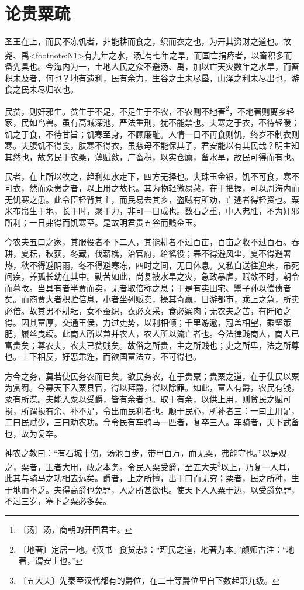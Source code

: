 \documentclass[12pt,UTF-8,openany]{ctexbook}
\begin{document}
\chapter{论贵粟疏}

\begin{normalsize}
    
    圣王在上，而民不冻饥者，非能耕而食之，织而衣之也，为开其资财之道也。故尧、禹<footnote:N1>有九年之水，汤\footnote{〔汤〕汤，商朝的开国君主。}有七年之旱，而国亡捐瘠者，以畜积多而备先具也。今海内为一，土地人民之众不避汤、禹，加以亡天灾数年之水旱，而畜积未及者，何也？地有遗利，民有余力，生谷之土未尽垦，山泽之利未尽出也，游食之民未尽归农也。
    
    民贫，则奸邪生。贫生于不足，不足生于不农，不农则不地著\footnote{〔地著〕定居一地。《汉书·食货志》：“理民之道，地著为本。”颜师古注：“地著，谓安土也。”}，不地著则离乡轻家，民如鸟兽。虽有高城深池，严法重刑，犹不能禁也。夫寒之于衣，不待轻暖；饥之于食，不待甘旨；饥寒至身，不顾廉耻。人情一日不再食则饥，终岁不制衣则寒。夫腹饥不得食，肤寒不得衣，虽慈母不能保其子，君安能以有其民哉？明主知其然也，故务民于农桑，薄赋敛，广畜积，以实仓廪，备水旱，故民可得而有也。
    
    民者，在上所以牧之，趋利如水走下，四方无择也。夫珠玉金银，饥不可食，寒不可衣，然而众贵之者，以上用之故也。其为物轻微易藏，在于把握，可以周海内而无饥寒之患。此令臣轻背其主，而民易去其乡，盗贼有所劝，亡逃者得轻资也。粟米布帛生于地，长于时，聚于力，非可一日成也。数石之重，中人弗胜，不为奸邪所利；一日弗得而饥寒至。是故明君贵五谷而贱金玉。
    
    今农夫五口之家，其服役者不下二人，其能耕者不过百亩，百亩之收不过百石。春耕，夏耘，秋获，冬藏，伐薪樵，治官府，给徭役；春不得避风尘，夏不得避署热，秋不得避阴雨，冬不得避寒冻，四时之间，无日休息。又私自送往迎来，吊死问疾，养孤长幼在其中。勤苦如此，尚复被水旱之灾，急政暴虐，赋敛不时，朝令而暮改。当具有者半贾而卖，无者取倍称之息；于是有卖田宅、鬻子孙以偿债者矣。而商贾大者积贮倍息，小者坐列贩卖，操其奇赢，日游都市，乘上之急，所卖必倍。故其男不耕耘，女不蚕织，衣必文采，食必粱肉；无农夫之苦，有阡陌之得。因其富厚，交通王侯，力过吏势，以利相倾；千里游遨，冠盖相望，乘坚策肥，履丝曳缟。此商人所以兼并农人，农人所以流亡者也。今法律贱商人，商人已富贵矣；尊农夫，农夫已贫贱矣。故俗之所贵，主之所贱也；吏之所卑，法之所尊也。上下相反，好恶乖迕，而欲国富法立，不可得也。
    
    方今之务，莫若使民务农而已矣。欲民务农，在于贵粟；贵粟之道，在于使民以粟为赏罚。今募天下入粟县官，得以拜爵，得以除罪。如此，富人有爵，农民有钱，粟有所渫。夫能入粟以受爵，皆有余者也。取于有余，以供上用，则贫民之赋可损，所谓损有余、补不足，令出而民利者也。顺于民心，所补者三：一曰主用足，二曰民赋少，三曰劝农功。今令民有车骑马一匹者，复卒三人。车骑者，天下武备也，故为复卒。
    
    神农之教曰：“有石城十仞，汤池百步，带甲百万，而无粟，弗能守也。”以是观之，粟者，王者大用，政之本务。令民入粟受爵，至五大夫\footnote{〔五大夫〕先秦至汉代都有的爵位，在二十等爵位里自下数起第九级。}以上，乃复一人耳，此其与骑马之功相去远矣。爵者，上之所擅，出于口而无穷；粟者，民之所种，生于地而不乏。夫得高爵也免罪，人之所甚欲也。使天下人入粟于边，以受爵免罪，不过三岁，塞下之粟必多矣。
\end{normalsize}
\end{document}
